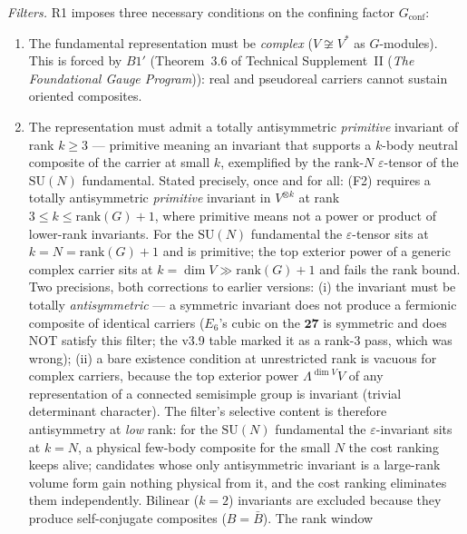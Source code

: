 \documentclass[11pt]{article}
\theoremstyle{definition}
\newcommand{\SU}{\mathrm{SU}}
\newcommand{\TSII}{Technical Supplement~II (\emph{The Foundational Gauge Program})}
\begin{document}
\noindent\textit{Filters.}  R1 imposes three necessary conditions on the
confining factor $G_{\mathrm{conf}}$:
\begin{enumerate}[label=(F\arabic*),nosep]
  \item The fundamental representation must be \emph{complex}
        ($V \not\cong V^*$ as $G$-modules).  This is forced by $B1'$
        (Theorem~3.6 of \TSII{}): real and pseudoreal carriers
        cannot sustain oriented composites.
  \item The representation must admit a totally antisymmetric
        \emph{primitive} invariant of rank $k \ge 3$ --- primitive
        meaning an invariant that supports a $k$-body neutral composite
        of the carrier at small $k$, exemplified by the rank-$N$
        $\varepsilon$-tensor of the $\SU(N)$ fundamental.  Stated
        precisely, once and for all: (F2) requires a totally
        antisymmetric \emph{primitive} invariant in $V^{\otimes k}$ at
        rank $3 \le k \le \mathrm{rank}(G) + 1$, where primitive means
        not a power or product of lower-rank invariants.  For the
        $\SU(N)$ fundamental the $\varepsilon$-tensor sits at
        $k = N = \mathrm{rank}(G) + 1$ and is primitive; the top
        exterior power of a generic complex carrier sits at
        $k = \dim V \gg \mathrm{rank}(G) + 1$ and fails the rank
        bound.  Two
        precisions, both corrections to earlier versions: (i) the
        invariant must be totally \emph{antisymmetric} --- a symmetric
        invariant does not produce a fermionic composite of identical
        carriers ($E_6$'s cubic on the $\mathbf{27}$ is symmetric and
        does NOT satisfy this filter; the v3.9 table marked it as a
        rank-3 pass, which was wrong); (ii) a bare existence condition
        at unrestricted rank is vacuous for complex carriers, because
        the top exterior power $\Lambda^{\dim V} V$ of any
        representation of a connected semisimple group is invariant
        (trivial determinant character).  The filter's selective
        content is therefore antisymmetry at \emph{low} rank: for the
        $\SU(N)$ fundamental the $\varepsilon$-invariant sits at
        $k = N$, a physical few-body composite for the small $N$ the
        cost ranking keeps alive; candidates whose only antisymmetric
        invariant is a large-rank volume form gain nothing physical
        from it, and the cost ranking eliminates them independently.
        Bilinear ($k=2$) invariants are excluded because they produce
        self-conjugate composites ($B = \bar{B}$).  The rank window

\end{enumerate}
\end{document}
